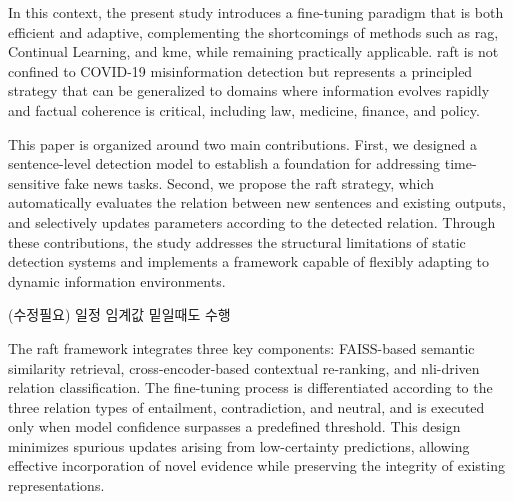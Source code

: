 \documentclass[a4paper,fleqn]{cas-sc}
\begin{document}
In this context, the present study introduces a fine-tuning paradigm that is both efficient and adaptive, complementing the shortcomings of methods such as \gls{rag}, Continual Learning, and \gls{kme}, while remaining practically applicable. \gls{raft} is not confined to COVID-19 misinformation detection but represents a principled strategy that can be generalized to domains where information evolves rapidly and factual coherence is critical, including law, medicine, finance, and policy.

This paper is organized around two main contributions.
First, we designed a sentence-level detection model to establish a foundation for addressing time-sensitive fake news tasks.
Second, we propose the \gls{raft} strategy, which automatically evaluates the relation between new sentences and existing outputs, and selectively updates parameters according to the detected relation. Through these contributions, the study addresses the structural limitations of static detection systems and implements a framework capable of flexibly adapting to dynamic information environments.

(수정필요) 일정 임계값 밑일때도 수행

The \gls{raft} framework integrates three key components: FAISS-based semantic similarity retrieval, cross-encoder-based contextual re-ranking, and \gls{nli}-driven relation classification. The fine-tuning process is differentiated according to the three relation types of entailment, contradiction, and neutral, and is executed only when model confidence surpasses a predefined threshold. This design minimizes spurious updates arising from low-certainty predictions, allowing effective incorporation of novel evidence while preserving the integrity of existing representations.
\end{document}
